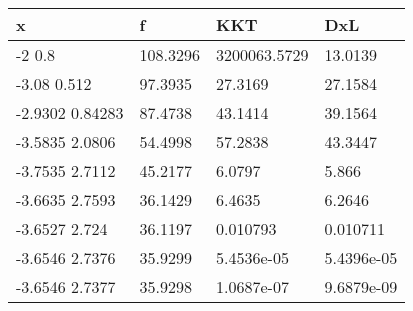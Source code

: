 \begin{tabular}{llll}
x & f & KKT & DxL \\ 
\hline 
-2         0.8 & 108.3296 & 3200063.5729 & 13.0139 \\ 
-3.08       0.512 & 97.3935 & 27.3169 & 27.1584 \\ 
-2.9302     0.84283 & 87.4738 & 43.1414 & 39.1564 \\ 
-3.5835      2.0806 & 54.4998 & 57.2838 & 43.3447 \\ 
-3.7535      2.7112 & 45.2177 & 6.0797 & 5.866 \\ 
-3.6635      2.7593 & 36.1429 & 6.4635 & 6.2646 \\ 
-3.6527       2.724 & 36.1197 & 0.010793 & 0.010711 \\ 
-3.6546      2.7376 & 35.9299 & 5.4536e-05 & 5.4396e-05 \\ 
-3.6546      2.7377 & 35.9298 & 1.0687e-07 & 9.6879e-09 \\ 
\hline 
\end{tabular}